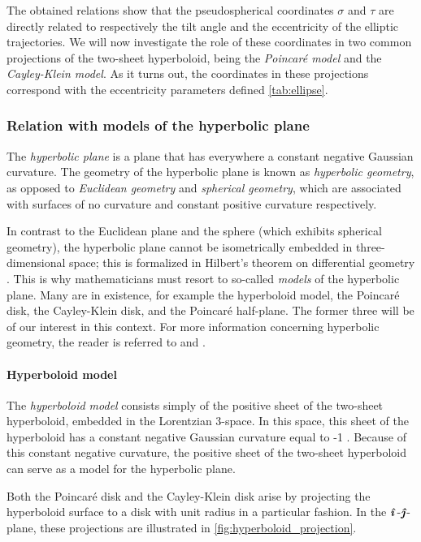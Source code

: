 The obtained relations show that the pseudospherical coordinates \(\sigma\) and \(\tau\) are directly related to respectively the tilt angle and the eccentricity of the elliptic trajectories. We will now investigate the role of these coordinates in two common projections of the two-sheet hyperboloid, being the \emph{Poincaré model} and the \emph{Cayley-Klein model}. As it turns out, the coordinates in these projections correspond with the eccentricity parameters defined \cref{tab:ellipse}.

\subsubsection{Relation with models of the hyperbolic plane}
The \emph{hyperbolic plane} is a plane that has everywhere a constant negative Gaussian curvature. The geometry of the hyperbolic plane is known as \emph{hyperbolic geometry}, as opposed to \emph{Euclidean geometry} and \emph{spherical geometry}, which are associated with surfaces of no curvature and constant positive curvature respectively. 

In contrast to the Euclidean plane and the sphere (which exhibits spherical geometry), the hyperbolic plane cannot be isometrically embedded in three-dimensional space; this is formalized in Hilbert's theorem on differential geometry \cite{Thurston1997}. This is why mathematicians must resort to so-called \emph{models} of the hyperbolic plane. Many are in existence, for example the hyperboloid model, the Poincaré disk, the Cayley-Klein disk, and the Poincaré half-plane. The former three will be of our interest in this context. For more information concerning hyperbolic geometry, the reader is referred to \citet{Needham1997,Needham2021} and \citet{Thurston1997}.

\paragraph{Hyperboloid model} The \emph{hyperboloid model} consists simply of the positive sheet of the two-sheet hyperboloid, embedded in the Lorentzian 3-space. In this space, this sheet of the hyperboloid has a constant negative Gaussian curvature equal to -1 \cite{Balazs1986}. Because of this constant negative curvature, the positive sheet of the two-sheet hyperboloid can serve as a model for the hyperbolic plane.

Both the Poincaré disk and the Cayley-Klein disk arise by projecting the hyperboloid surface to a disk with unit radius in a particular fashion. In the \(\quati\)-\(\quatj\)-plane, these projections are illustrated in \cref{fig:hyperboloid_projection}.


